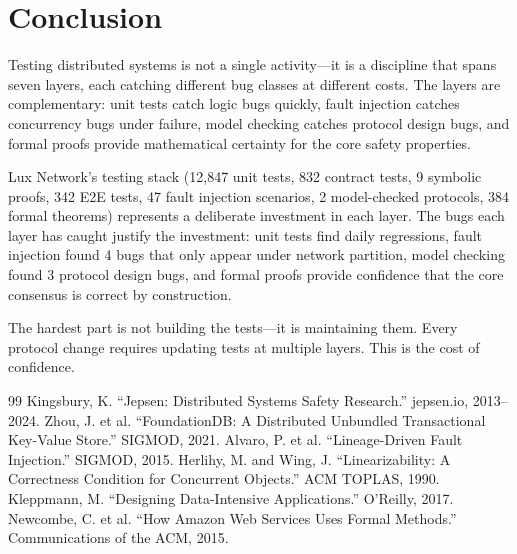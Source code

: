 \section{Conclusion}


Testing distributed systems is not a single activity---it is a discipline that spans
seven layers, each catching different bug classes at different costs. The layers are
complementary: unit tests catch logic bugs quickly, fault injection catches concurrency
bugs under failure, model checking catches protocol design bugs, and formal proofs
provide mathematical certainty for the core safety properties.

Lux Network's testing stack (12,847 unit tests, 832 contract tests, 9 symbolic proofs,
342 E2E tests, 47 fault injection scenarios, 2 model-checked protocols, 384 formal
theorems) represents a deliberate investment in each layer. The bugs each layer has
caught justify the investment: unit tests find daily regressions, fault injection found
4 bugs that only appear under network partition, model checking found 3 protocol design
bugs, and formal proofs provide confidence that the core consensus is correct by
construction.

The hardest part is not building the tests---it is maintaining them. Every protocol
change requires updating tests at multiple layers. This is the cost of confidence.

\begin{thebibliography}{99}
 Kingsbury, K. ``Jepsen: Distributed Systems Safety Research.'' jepsen.io, 2013--2024.
 Zhou, J. et al. ``FoundationDB: A Distributed Unbundled Transactional Key-Value Store.'' SIGMOD, 2021.
 Alvaro, P. et al. ``Lineage-Driven Fault Injection.'' SIGMOD, 2015.
 Herlihy, M. and Wing, J. ``Linearizability: A Correctness Condition for Concurrent Objects.'' ACM TOPLAS, 1990.
 Kleppmann, M. ``Designing Data-Intensive Applications.'' O'Reilly, 2017.
 Newcombe, C. et al. ``How Amazon Web Services Uses Formal Methods.'' Communications of the ACM, 2015.
\end{thebibliography}

